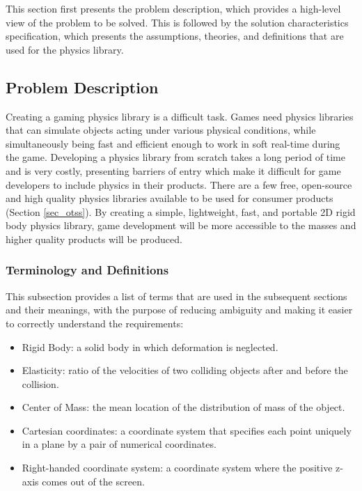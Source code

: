 \documentclass[12pt]{article}
\begin{document}
This section first presents the problem description, which provides a high-level
view of the problem to be solved. This is followed by the solution
characteristics specification, which presents the assumptions, theories, 
and definitions that are used for the physics library.

\subsection{Problem Description} \label{Sec_pd}

Creating a gaming physics library is a difficult task. Games need 
physics libraries that can simulate objects acting under various physical conditions, while simultaneously 
being fast and efficient enough to work in soft real-time during the game. Developing a physics library from scratch
takes a long period of time and is very costly, presenting barriers of entry which make it difficult for game developers
to include physics in their products. There are a few free, open-source and high quality physics libraries available to be
 used for consumer products (Section \ref{sec_otss}). By creating a simple, lightweight, fast, and portable 2D rigid 
body physics library, game development will be more accessible to the masses and higher quality products will be produced.

\subsubsection{Terminology and Definitions}

This subsection provides a list of terms that are used in the subsequent
sections and their meanings, with the purpose of reducing ambiguity and making it
easier to correctly understand the requirements:

\begin{itemize}

\item Rigid Body: a solid body in which deformation is neglected.
\item Elasticity: ratio of the velocities of two colliding objects after and
before the collision.
\item Center of Mass: the mean location of the distribution of mass of the object.
\item  Cartesian coordinates: a coordinate system that specifies each point uniquely in a plane by a pair of numerical coordinates.
\item  Right-handed coordinate system: a coordinate system where the positive z-axis comes out of the screen.

\end{itemize}
\end{document}

